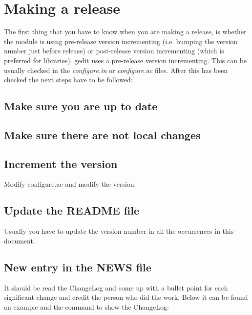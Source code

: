 
\chapter{Making a release}

The first thing that you have to know when you are making a release, is whether the module is using pre-release version incrementing (i.e. bumping the version number just before release) or post-release version incrementing (which is preferred for libraries). gedit uses a pre-release version incrementing. This can be usually checked in the \emph{configure.in} or \emph{configure.ac} files. After this has been checked the next steps have to be followed:

\section*{Make sure you are up to date}

\noindent{}

\section*{Make sure there are not local changes}

\noindent{}

\section*{Increment the version}

\noindent Modify configure.ac and modify the version.

\section*{Update the README file}

\noindent Usually you have to update the version number in all the occurrences in this document.

\section*{New entry in the NEWS file}

\noindent It should be read the ChangeLog and come up with a bullet point for each significant change and credit the person who did the work. Below it can be found an example and the command to show the ChangeLog:

